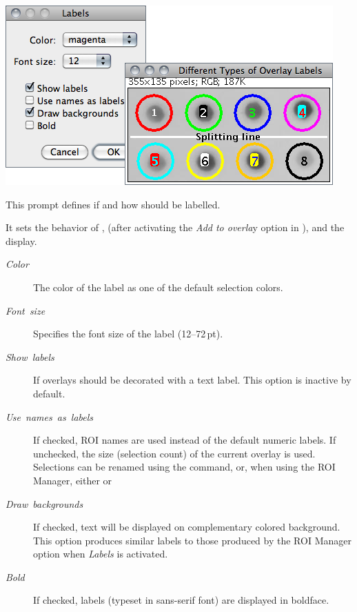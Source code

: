 \begin{minipage}[c][1\totalheight][t]{0.642\columnwidth}%
\noindent \includegraphics[scale=0.55]{images/OverlayLabels}%
\end{minipage}%
\begin{minipage}[c][1\totalheight][t]{0.358\columnwidth}%
This prompt defines if and how 
should be labelled.\medskip{}


It sets the behavior of ,
 (after
activating the \emph{Add to overla}y option in ),
and the  
display. %
\end{minipage}
\begin{description}
\item [{\emph{Color}}] The color of the label as one of the default selection
colors.
\item [{\emph{Font\ size}}] Specifies the font size of the label (12--72\,pt).
\item [{\emph{Show\ labels}}] If overlays should be decorated with a text
label. This option is inactive by default.
\item [{\emph{Use\ names\ as\ labels}}] If checked, ROI names are used
instead of the default numeric labels. If unchecked, the size (selection
count) of the current overlay is used. Selections can be renamed using
the 
command, or, when using the ROI Manager, either 
or 
\item [{\emph{Draw\ backgrounds}}] If checked, text will be displayed
on complementary colored background. This option produces similar
labels to those produced by the ROI Manager 
option when \emph{Labels }is activated.
\item [{\emph{Bold}}] If checked, labels (typeset in sans-serif font) are
displayed in boldface.
\end{description}


